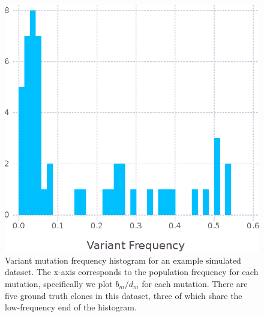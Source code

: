 \documentclass{bioinfo}
\begin{document}
\begin{methods}
\begin{figure}
\includegraphics[width=0.9\columnwidth]{../figures/simulated_data.eps}
\caption{Variant mutation frequency histogram for an example simulated dataset.  The x-axis corresponds to the population frequency for each mutation, specifically we plot $b_m/d_m$ for each mutation.  There are five ground truth clones in this dataset, three of which share the low-frequency end of the histogram.}
\label{fig:data}
\end{figure} 



\end{methods}
\end{document}
